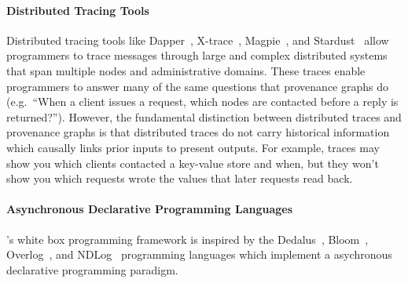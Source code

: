 \paragraph{Distributed Tracing Tools}
Distributed tracing tools like Dapper~\cite{sigelman2010dapper},
X-trace~\cite{fonseca2007x}, Magpie~\cite{barham2003magpie}, and
Stardust~\cite{thereska2006stardust} allow programmers to trace messages
through large and complex distributed systems that span multiple nodes and
administrative domains. These traces enable programmers to answer many of the
same questions that provenance graphs do (e.g.\ ``When a client issues a
request, which nodes are contacted before a reply is returned?''). However, the
fundamental distinction between distributed traces and provenance graphs is
that distributed traces do not carry historical information which causally
links prior inputs to present outputs. For example, traces may show you which
clients contacted a key-value store and when, but they won't show you which
requests wrote the values that later requests read back. 

\paragraph{Asynchronous Declarative Programming Languages}
\fluent{}'s white box programming framework is inspired by the
Dedalus~\cite{alvaro2011dedalus}, Bloom~\cite{alvaro2011consistency,
conway2012logic}, Overlog~\cite{loo2005implementing}, and
NDLog~\cite{loo2009declarative} programming languages which implement a
asychronous declarative programming paradigm.
